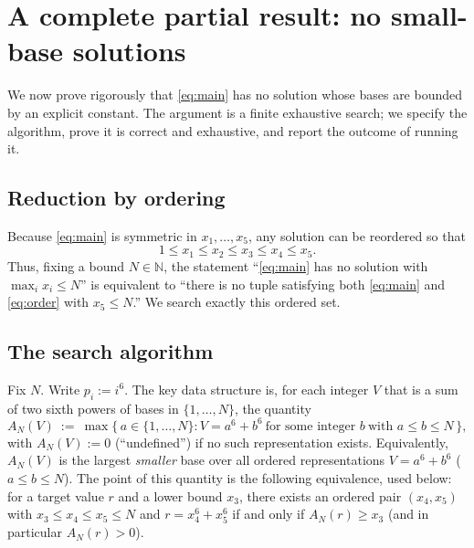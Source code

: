 \documentclass{amsart}
\begin{document}
\section*{A complete partial result: no small-base solutions}

We now prove rigorously that \eqref{eq:main} has no solution whose
bases are bounded by an explicit constant. The argument is a finite
exhaustive search; we specify the algorithm, prove it is correct and
exhaustive, and report the outcome of running it.

\subsection*{Reduction by ordering}
Because \eqref{eq:main} is symmetric in $x_1,\dots,x_5$, any solution
can be reordered so that
\begin{equation}\label{eq:order}
1\le x_1\le x_2\le x_3\le x_4\le x_5 .
\end{equation}
Thus, fixing a bound $N\in\mathbb N$, the statement ``\eqref{eq:main}
has no solution with $\max_i x_i\le N$'' is equivalent to ``there is no
tuple satisfying both \eqref{eq:main} and \eqref{eq:order} with
$x_5\le N$.'' We search exactly this ordered set.

\subsection*{The search algorithm}
Fix $N$. Write $p_i:=i^6$. The key data structure is, for each integer
$V$ that is a sum of two sixth powers of bases in $\{1,\dots,N\}$, the
quantity
\begin{equation}\label{eq:maxa}
A_N(V)\ :=\ \max\{\,a\in\{1,\dots,N\}: V=a^6+b^6\ \text{for some integer }b\ \text{with } a\le b\le N\,\},
\end{equation}
with $A_N(V):=0$ (``undefined'') if no such representation exists.
Equivalently, $A_N(V)$ is the largest \emph{smaller} base over all
ordered representations $V=a^6+b^6$ ($a\le b\le N$). The point of this
quantity is the following equivalence, used below: for a target value
$r$ and a lower bound $x_3$, there exists an ordered pair
$(x_4,x_5)$ with $x_3\le x_4\le x_5\le N$ and $r=x_4^6+x_5^6$ if and
only if $A_N(r)\ge x_3$ (and in particular $A_N(r)>0$).
\end{document}
